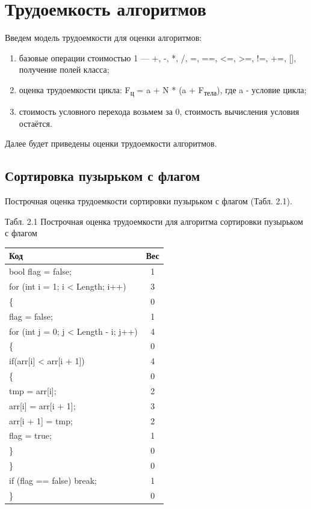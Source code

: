 \documentclass[12pt]{report}
\begin{document}
\section{Трудоемкость алгоритмов}
Введем модель трудоемкости для оценки алгоритмов:
\begin{enumerate}
  	\item  базовые операции стоимостью 1 — +, -, *, /, =, ==, <=, >=, !=, +=, [], получение полей класса;
	\item оценка трудоемкости цикла: F\textsubscript{ц} = a + N * (a + F\textsubscript{тела}), где a - условие цикла;
	\item стоимость условного перехода возьмем за 0, стоимость вычисления условия остаётся.
\end{enumerate}

Далее будет приведены оценки трудоемкости алгоритмов. 

\subsection{Сортировка пузырьком с флагом}
Построчная оценка трудоемкости сортировки пузырьком с флагом (Табл. 2.1).
\begin{center}
Табл. 2.1 Построчная оценка трудоемкости для алгоритма сортировки пузырьком с флагом

	\begin{tabular}{|l c|} 
 	\hline
	Код & Вес \\ [0.5ex] 
 	\hline
	bool flag = false; & 1\\
 	\hline
	for (int i = 1; i < Length; i++) & 3\\
	\hline
	\{ & 0\\
	\hline
	flag = false; & 1\\
 	\hline
	for (int j = 0; j < Length - i; j++) & 4\\
	\hline
	\{ & 0\\	
	\hline
	if(arr[i] < arr[i + 1]) & 4\\
	\hline
	\{ & 0\\
	\hline
	tmp = arr[i]; & 2\\
	\hline
    arr[i] = arr[i + 1]; & 3\\
    \hline
    arr[i + 1] = tmp; & 2\\
    \hline
    flag = true; & 1\\
    \hline
    \} & 0\\
	\hline
	\} & 0\\
	\hline
	if (flag == false) break;  & 1\\
	\hline
	\} & 0\\
	\hline
	\end{tabular}
\end{center}
\end{document}
